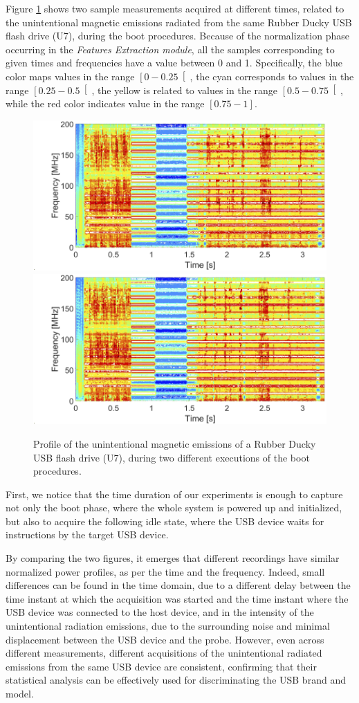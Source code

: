 \documentclass[acmsmall, authorversion]{acmart}
\begin{document}
Figure \ref{fig:RD} shows two sample measurements acquired at different times, related to the unintentional magnetic emissions radiated from the same Rubber Ducky USB flash drive (U7), during the boot procedures. Because of the normalization phase occurring in the \emph{Features Extraction module}, all the samples corresponding to given times and frequencies have a value between 0 and 1. Specifically, the blue color maps values in the range $\left[ 0 - 0.25 \right[$, the cyan corresponds to values in the range $\left[ 0.25 - 0.5 \right[$, the yellow is related to values in the range $\left[ 0.5 - 0.75 \right[$, while the red color indicates value in the range $\left[ 0.75 - 1 \right]$.
\begin{figure}[htbp]
    \includegraphics[width=.49\columnwidth]{Figures/RD_1.png}
    \includegraphics[width=.49\columnwidth]{Figures/RD_2.png}
    \centering
    \caption{Profile of the unintentional magnetic emissions of a Rubber Ducky USB flash drive (U7), during two different executions of the boot procedures.}
    \label{fig:RD}
\end{figure}

First, we notice that the time duration of our experiments is enough to capture not only the boot phase, where the whole system is powered up and initialized, but also to acquire the following idle state, where the USB device waits for instructions by the target USB device.

By comparing the two figures, it emerges that different recordings have similar normalized power profiles, as per the time and the frequency. Indeed, small differences can be found in the time domain, due to a different delay between the time instant at which the acquisition was started and the time instant where the USB device was connected to the host device, and in the intensity of the unintentional radiation emissions, due to the surrounding noise and minimal displacement between the USB device and the probe. However, even across different measurements, different acquisitions of the unintentional radiated emissions from the same USB device are consistent, confirming that their statistical analysis can be effectively used for discriminating the USB brand and model. 
\end{document}
